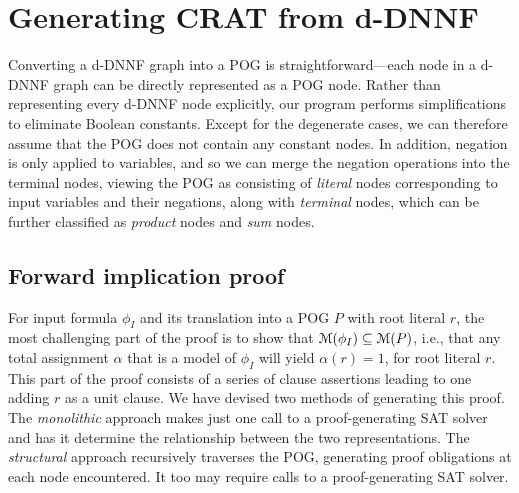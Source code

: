\documentclass[letterpaper,USenglish,cleveref, autoref, thm-restate]{lipics-v2021}
\newcommand{\assign}{\alpha}
\newcommand{\modelset}{{\cal M}}
\newcommand{\inputformula}{\phi_I}
\newcommand{\progname}[1]{\textsc{#1}}
\newcommand{\dfour}{\progname{D4}}
\begin{document}
\section{Generating CRAT from d-DNNF}
\label{section:generating:crat}

Converting a d-DNNF
graph into a POG is straightforward---each node in a d-DNNF graph can
be directly represented as a POG node.  Rather than representing every
d-DNNF node explicitly, our program performs simplifications to
eliminate Boolean constants.
Except for the degenerate cases,
we can therefore assume
that the POG does not contain any constant nodes.
In addition, negation is only
applied to variables, and so we can merge the negation operations into the terminal nodes,
viewing the POG as consisting
of {\em literal} nodes corresponding to input variables and their negations, along with
{\em terminal} nodes, which can be further classified as {\em product} nodes and {\em sum} nodes.

\subsection{Forward implication proof}

For input formula $\inputformula$ and its translation into a POG $P$
with root literal $r$, the most challenging part of the proof is to
show that $\modelset(\inputformula) \subseteq \modelset(P)$, i.e.,
that any total assignment $\alpha$ that is a model of $\inputformula$
will yield $\assign(r) = 1$, for root literal $r$.  This part of the
proof consists of a series of clause assertions leading to one adding
$r$ as a unit clause.  We have devised two methods of generating this
proof.  The {\em monolithic} approach makes just one call to a
proof-generating SAT solver and has it determine the relationship
between the two representations.  The {\em structural} approach
recursively traverses the POG, generating proof obligations at each
node encountered.  It too may require calls to a proof-generating SAT
solver.
\end{document}
